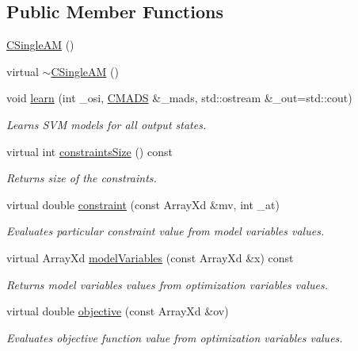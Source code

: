 \subsection*{Public Member Functions}
\begin{DoxyCompactItemize}
\item 
\hyperlink{class_go_s_u_m_1_1_c_single_a_m_accbb7ba32186ee30058bdccb3afe6bb9}{C\-Single\-A\-M} ()
\item 
virtual \hyperlink{class_go_s_u_m_1_1_c_single_a_m_a8395a9eb190fe512a57a3bff53337fd1}{$\sim$\-C\-Single\-A\-M} ()
\item 
void \hyperlink{class_go_s_u_m_1_1_c_single_a_m_a65782671f1530d2f88fc810b28163f86}{learn} (int \-\_\-osi, \hyperlink{class_c_m_a_d_s}{C\-M\-A\-D\-S} \&\-\_\-mads, std\-::ostream \&\-\_\-out=std\-::cout)
\begin{DoxyCompactList}\small\item\em Learns S\-V\-M models for all output states. \end{DoxyCompactList}\item 
virtual int \hyperlink{class_go_s_u_m_1_1_c_single_a_m_a77486d18726fc335328dd02bc676f74e}{constraints\-Size} () const 
\begin{DoxyCompactList}\small\item\em Returns size of the constraints. \end{DoxyCompactList}\item 
virtual double \hyperlink{class_go_s_u_m_1_1_c_single_a_m_ab45bdd4b3d7b5cab88e05ed6cd98e7e6}{constraint} (const Array\-Xd \&mv, int \-\_\-at)
\begin{DoxyCompactList}\small\item\em Evaluates particular constraint value from model variables values. \end{DoxyCompactList}\item 
virtual Array\-Xd \hyperlink{class_go_s_u_m_1_1_c_single_a_m_a47f92af4be18d3ae094abd65eb4a7105}{model\-Variables} (const Array\-Xd \&x) const 
\begin{DoxyCompactList}\small\item\em Returns model variables values from optimization variables values. \end{DoxyCompactList}\item 
virtual double \hyperlink{class_go_s_u_m_1_1_c_single_a_m_a1a4a43ffb8faf177242320a686acf799}{objective} (const Array\-Xd \&ov)
\begin{DoxyCompactList}\small\item\em Evaluates objective function value from optimization variables values. \end{DoxyCompactList}\item 

\end{DoxyCompactItemize}
